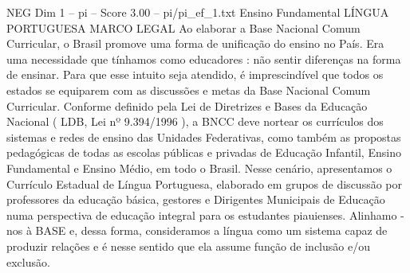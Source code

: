 \begin{textsample}{NEG Dim 1 – pi – Score 3.00 – pi/pi\_ef\_1.txt}  \label{ex:f1_neg_233}
Ensino Fundamental LÍNGUA PORTUGUESA MARCO LEGAL Ao elaborar a Base Nacional Comum Curricular, o Brasil promove uma forma de unificação do ensino no País.
Era uma necessidade que tínhamos como educadores : não sentir diferenças na forma de ensinar.
Para que esse intuito seja atendido, é imprescindível que todos os estados se equiparem com as discussões e metas da Base Nacional Comum Curricular.
Conforme definido pela Lei de Diretrizes e Bases da Educação Nacional ( LDB, Lei nº 9.394/1996 ), a BNCC deve nortear os currículos dos sistemas e redes de ensino das Unidades Federativas, como também as propostas pedagógicas de todas as escolas públicas e privadas de Educação Infantil, Ensino Fundamental e Ensino Médio, em todo o Brasil.
Nesse cenário, apresentamos o Currículo Estadual de Língua Portuguesa, elaborado em grupos de discussão por professores da educação básica, gestores e Dirigentes Municipais de Educação numa perspectiva de educação integral para os estudantes piauienses.
Alinhamo -nos à BASE e, dessa forma, consideramos a língua como um sistema capaz de produzir relações e é nesse sentido que ela assume função de inclusão e/ou exclusão.

\end{textsample}
